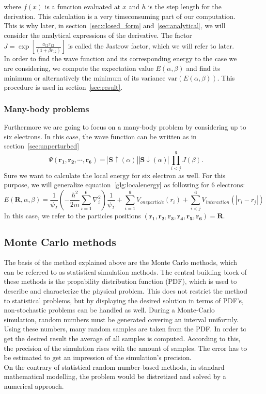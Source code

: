 where $f(x)$ is a function evaluated at $x$ and $h$ is the step length for the derivation. This calculation is a very timeconsuming part of our computation. This is why later, in section~\ref{sec:closed_form} and~\ref{sec:analytical}, we will consider the analytical expressions of the derivative.
The factor $J = \exp \left[ \frac{a_{12} r_{12}}{(1+\beta r_{12})} \right]$ is called the Jastrow factor, which we will refer to later.\\
In order to find the wave function and its corresponding energy to the case we are considering, we compute the expectation value $E(\alpha, \beta)$ and find its minimum or alternatively the minimum of its variance $\mathrm{var}(E(\alpha, \beta))$. This procedure is used in section~\ref{sec:result}.
\subsubsection{Many-body problems}
Furthermore we are going to focus on a many-body problem by considering up to six electrons. In this case, the wave function can be written as in section~\ref{sec:unperturbed}
\begin{equation}\label{glg:sixelectron}
\Psi(\mathbf{r_1,r_2,\cdots, r_6})= |\mathbf{S\uparrow}(\alpha)||\mathbf{S\downarrow}(\alpha)|\prod_{i<j}^6 J(\beta).
\end{equation}
Sure we want to calculate the local energy for six electron as well. For this purpose, we will generalize equation~\ref{glg:localenergy} as following for $6$ electrons:
\begin{equation}
E(\mathbf{R},\alpha,\beta) = \frac{1}{\psi_T} \left(-\frac{\hbar^2}{2m}\sum_{i=1}^6 \nabla^2_i\right) \frac{1}{\psi_T} + \sum_{i=1}^6 V_{oneparticle}(r_i) + \sum_{i<j}^6 V_{interaction}(|r_i-r_j|)
\end{equation}
In this case, we refer to the particles positions $(\mathbf{r_1,r_2,r_3,r_4,r_5,r_6})=\mathbf{R}$.
\subsection{Monte Carlo methods}
The basis of the method explained above are the Monte Carlo methods, which can be referred to as statistical simulation methods. The central building block of these methods is the propability distribution function (PDF), which is used to describe and characterize the physical problem. This does not restrict the method to statistical problems, but by displaying the desired solution in terms of PDF's, non-stochastic problems can be handled as well. During a Monte-Carlo simulation, random numbers must be generated covering an interval uniformly. Using these numbers, many random samples are taken from the PDF. In order to get the desired result the average of all samples is computed. According to this, the precision of the simulation rises with the amount of samples. The error has to be estimated to get an impression of the simulation's precision.\\
On the contrary of statistical random number-based methods, in standard mathematical modelling, the problem would be distretized and solved by a numerical approach.\\
